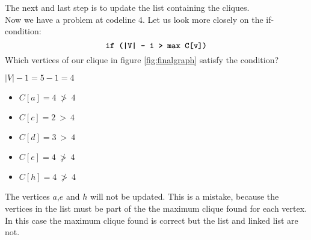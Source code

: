 \documentclass[12pt, xcolor=dvipsnames]{scrartcl}
\theoremstyle{definition}
\theoremstyle{definition}
\begin{document}
          The next and last step is to update the list containing the cliques.\\
          Now we have a problem at codeline 4. Let us look more closely on the if-condition:
          \[ \textbf{\texttt{if (|V| - 1 > max C[v])}} \]
          Which vertices of our clique in figure \ref{fig:finalgraph} satisfy the condition? 

          $|V| - 1 = 5 - 1 = 4$

          \begin{itemize}
            \item[\textcolor{red}{\textbullet}] $C[a] = 4 ~\ngtr~ 4$ 
            \item[\textcolor{Green}{\textbullet}] $C[c] = 2 ~>~ 4$
            \item[\textcolor{Green}{\textbullet}] $C[d] = 3 ~>~ 4$
            \item[\textcolor{red}{\textbullet}] $C[e] = 4 ~\ngtr~ 4$
            \item[\textcolor{red}{\textbullet}] $C[h] = 4 ~\ngtr~ 4$
          \end{itemize}

          The vertices $a$,$e$ and $h$ will not be updated. This is a mistake, because the vertices in the list must be part of the the maximum clique found for each vertex. In this case the maximum clique found is correct 
          but the list and linked list are not. 
\end{document}
